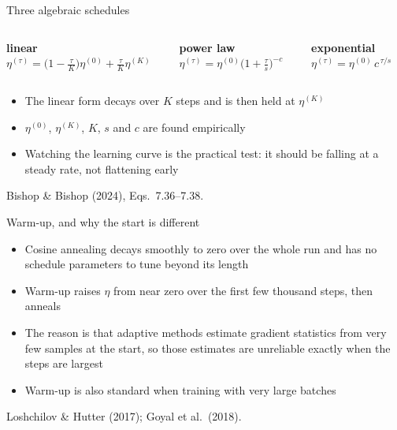 \documentclass[aspectratio=169, 11pt]{beamer}
\newcommand{\srcline}[1]{%
  \par\vspace{0.25em}%
  {\scriptsize\color{mcMuted}\hfill #1\par}}
\newcommand{\src}[3]{}      %
\begin{document}
\begin{frame}{Three algebraic schedules}
  \src{bishop2024}{equation}{7.36-7.38}
  \src{bishop2024}{section}{7.3.2}
  \vspace{0.2em}
  \begin{columns}[T, onlytextwidth]
    \begin{column}{0.33\textwidth}
      \centering \textbf{linear}\\[0.3em]
      $\eta^{(\tau)} = \big(1-\tfrac{\tau}{K}\big)\eta^{(0)}
        + \tfrac{\tau}{K}\eta^{(K)}$
    \end{column}
    \begin{column}{0.31\textwidth}
      \centering \textbf{power law}\\[0.3em]
      $\eta^{(\tau)} = \eta^{(0)}\big(1+\tfrac{\tau}{s}\big)^{-c}$
    \end{column}
    \begin{column}{0.33\textwidth}
      \centering \textbf{exponential}\\[0.3em]
      $\eta^{(\tau)} = \eta^{(0)}\, c^{\,\tau/s}$
    \end{column}
  \end{columns}
  \vspace{0.9em}
  \begin{itemize}\itemsep0.35em
    \item The linear form decays over $K$ steps and is then held at
          $\eta^{(K)}$
    \item $\eta^{(0)}$, $\eta^{(K)}$, $K$, $s$ and $c$ are found
          empirically
    \item Watching the learning curve is the practical test: it should
          be falling at a steady rate, not flattening early
  \end{itemize}
  \srcline{Bishop \& Bishop (2024), Eqs.~7.36--7.38.}
\end{frame}

\begin{frame}{Warm-up, and why the start is different}
  \src{prince2023}{page}{93}
  \src{goyal2018}{section}{2.2}
  \src{loshchilov2017}{equation}{5}
  \src{loshchilov2017}{section}{3}
  \vspace{0.3em}
  \begin{itemize}\itemsep0.45em
    \item Cosine annealing decays smoothly to zero over the whole run
          and has no schedule parameters to tune beyond its length
    \item \alert{Warm-up} raises $\eta$ from near zero over the first
          few thousand steps, then anneals
    \item The reason is that adaptive methods estimate gradient
          statistics from very few samples at the start, so those
          estimates are unreliable exactly when the steps are largest
    \item Warm-up is also standard when training with very large batches
  \end{itemize}
  \srcline{Loshchilov \& Hutter (2017); Goyal et al.~(2018).}
\end{frame}
\end{document}
